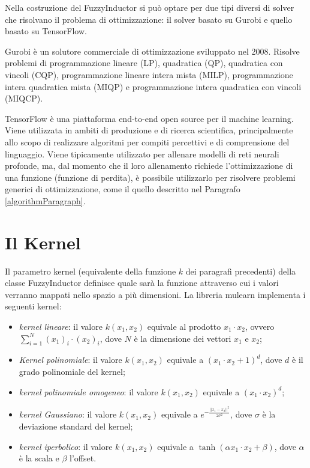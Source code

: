 \documentclass[12pt,a4paper]{report}
\begin{document}
Nella costruzione del FuzzyInductor si può optare per due tipi diversi di solver che risolvano il problema di ottimizzazione: il solver basato su Gurobi e quello basato su TensorFlow. 

Gurobi\cite{gurobi} è un solutore commerciale di ottimizzazione sviluppato nel 2008. Risolve problemi di programmazione lineare (LP), quadratica (QP), quadratica con vincoli (CQP), programmazione lineare intera mista (MILP), programmazione intera quadratica mista (MIQP) e programmazione intera quadratica con vincoli (MIQCP).

TensorFlow \cite{tensorFlow} è una piattaforma end-to-end open source per il machine learning. Viene utilizzata in ambiti di produzione e di ricerca scientifica, principalmente allo scopo di realizzare algoritmi per compiti percettivi e di comprensione del linguaggio. Viene tipicamente utilizzato per allenare modelli di reti neurali profonde, ma, dal momento che il loro allenamento richiede l'ottimizzazione di una funzione (funzione di perdita), è possibile utilizzarlo per risolvere problemi generici di ottimizzazione, come il quello descritto nel Paragrafo \ref{algorithmParagraph}.

\section{Il Kernel}\label{kernelSection}
Il parametro kernel (equivalente della funzione $k$ dei paragrafi precedenti) della classe FuzzyInductor definisce quale sarà la funzione attraverso cui i valori verranno mappati nello spazio a più dimensioni.
La libreria mulearn implementa i seguenti kernel:

\begin{itemize}
\item \emph{kernel lineare}: il valore $k(x_1,x_2)$ equivale al prodotto $x_1\cdot x_2$, ovvero  $\sum_{i=1}^N(x_1)_i\cdot(x_2)_i$, dove $N$ è la dimensione dei vettori $x_1$ e $x_2$;
\item \emph{Kernel polinomiale}: il valore $k(x_1,x_2)$ equivale a $(x_1\cdot x_2 + 1)^d$, dove $d$ è il grado polinomiale del kernel;
\item \emph{kernel polinomiale omogeneo}:  il valore  $k(x_1,x_2)$ equivale a $(x_1\cdot x_2)^d$;
\item \emph{kernel Gaussiano}:   il valore  $k(x_1,x_2)$ equivale a $e^{-\frac{||x_1 - x_2||^2}{2 \sigma^2}}$, dove $\sigma$ è la deviazione standard del kernel;
\item \emph{kernel iperbolico}:   il valore $k(x_1,x_2)$  equivale a $\tanh(\alpha x_1 \cdot x_2 + \beta)$, dove $\alpha$ è la scala e $\beta$ l'offset.
\end{itemize}
\end{document}
